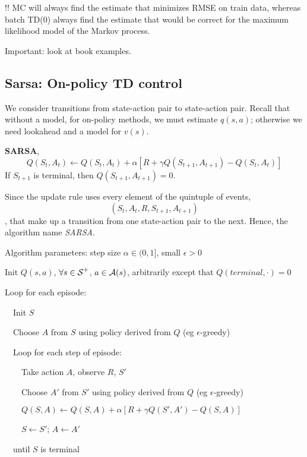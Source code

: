 \documentclass[sutton_barto_notes.tex]{subfiles}
\begin{document}
!! MC will always find the estimate that minimizes RMSE on train data, whereas batch TD(0) always find the estimate that would be correct for the maximum likelihood model of the Markov process.

Important: look at book examples.

\subsection{Sarsa: On-policy TD control}

We consider transitions from state-action pair to state-action pair. Recall that without a model, for on-policy methods, we must estimate $q(s,a)$; otherwise we need lookahead and a model for $v(s)$.

\begin{definition}
\textbf{SARSA},
$$ Q(S_t, A_t) \leftarrow Q(S_t, A_t) + \alpha [ R + \gamma Q( S_{t+1}, A_{t+1}) - Q(S_t, A_t)]$$
If $S_{t+1}$ is terminal, then $Q(S_{t+1}, A_{t+1}) = 0$.
\end{definition}

Since the update rule uses every element of the quintuple of events, $$(S_t, A_t, R, S_{t+1}, A_{t+1})$$, that make up a transition from one state-action pair to the next. Hence, the algorithm name \textit{SARSA}.

\begin{tcolorbox}[width=1.1\textwidth,title={SARSA (on-policy TD control} for estimating $Q\approx q_*$]
Algorithm parameters: step size $\alpha \in (0,1]$, small $\epsilon > 0$

Init $Q(s,a)$, $\forall s \in {\operatorname*{\mathcal{S}}}^+$, $a \in \operatorname*{\mathcal{A}}(s)$, arbitrarily except that $Q(terminal,\cdot)=0$

Loop for each episode:

$\quad$Init $S$

$\quad$Choose $A$ from $S$ using policy derived from $Q$ (eg $\epsilon$-greedy)

$\quad$Loop for each step of episode:

$\quad\quad$Take action $A$, observe $R$, $S'$

$\quad\quad$Choose $A'$ from $S'$ using policy derived from $Q$ (eg $\epsilon$-greedy)

$\quad\quad Q(S, A) \leftarrow Q(S, A) + \alpha [ R + \gamma Q( S', A') - Q(S, A)]$

$\quad\quad S \leftarrow S'$; $A \leftarrow A'$

$\quad$until $S$ is terminal
\end{tcolorbox}
\end{document}
